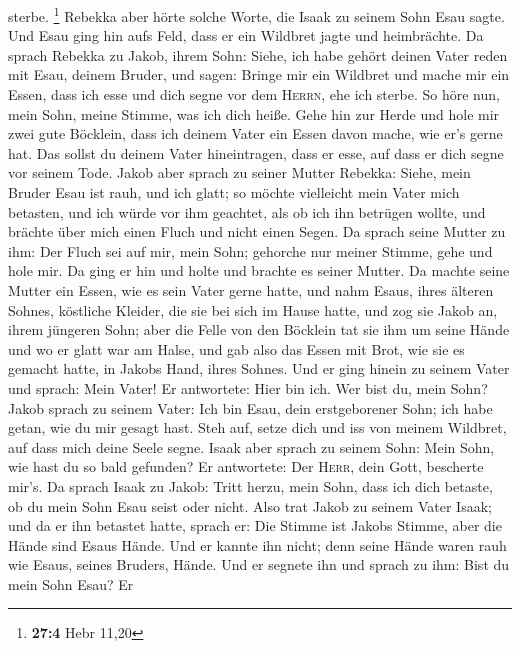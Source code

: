 sterbe. \footnote{\textbf{27:4} Hebr 11,20}  Rebekka aber
hörte solche Worte, die Isaak zu seinem Sohn Esau sagte. Und Esau ging
hin aufs Feld, dass er ein Wildbret jagte und heimbrächte.
 Da sprach Rebekka zu Jakob, ihrem Sohn: Siehe, ich habe
gehört deinen Vater reden mit Esau, deinem Bruder, und sagen:
 Bringe mir ein Wildbret und mache mir ein Essen, dass ich
esse und dich segne vor dem \textsc{Herrn}, ehe ich sterbe.
 So höre nun, mein Sohn, meine Stimme, was ich dich heiße.
 Gehe hin zur Herde und hole mir zwei gute Böcklein, dass
ich deinem Vater ein Essen davon mache, wie er's gerne hat.
 Das sollst du deinem Vater hineintragen, dass er esse,
auf dass er dich segne vor seinem Tode.  Jakob aber
sprach zu seiner Mutter Rebekka: Siehe, mein Bruder Esau ist rauh, und
ich glatt;  so möchte vielleicht mein Vater mich
betasten, und ich würde vor ihm geachtet, als ob ich ihn betrügen
wollte, und brächte über mich einen Fluch und nicht einen Segen.
 Da sprach seine Mutter zu ihm: Der Fluch sei auf mir,
mein Sohn; gehorche nur meiner Stimme, gehe und hole mir.
 Da ging er hin und holte und brachte es seiner Mutter.
Da machte seine Mutter ein Essen, wie es sein Vater gerne hatte,
 und nahm Esaus, ihres älteren Sohnes, köstliche Kleider,
die sie bei sich im Hause hatte, und zog sie Jakob an, ihrem jüngeren
Sohn;  aber die Felle von den Böcklein tat sie ihm um
seine Hände und wo er glatt war am Halse,  und gab also
das Essen mit Brot, wie sie es gemacht hatte, in Jakobs Hand, ihres
Sohnes.  Und er ging hinein zu seinem Vater und sprach:
Mein Vater! Er antwortete: Hier bin ich. Wer bist du, mein Sohn?
 Jakob sprach zu seinem Vater: Ich bin Esau, dein
erstgeborener Sohn; ich habe getan, wie du mir gesagt hast. Steh auf,
setze dich und iss von meinem Wildbret, auf dass mich deine Seele segne.
 Isaak aber sprach zu seinem Sohn: Mein Sohn, wie hast du
so bald gefunden? Er antwortete: Der \textsc{Herr}, dein Gott, bescherte
mir's.  Da sprach Isaak zu Jakob: Tritt herzu, mein Sohn,
dass ich dich betaste, ob du mein Sohn Esau seist oder nicht.
 Also trat Jakob zu seinem Vater Isaak; und da er ihn
betastet hatte, sprach er: Die Stimme ist Jakobs Stimme, aber die Hände
sind Esaus Hände.  Und er kannte ihn nicht; denn seine
Hände waren rauh wie Esaus, seines Bruders, Hände. Und er segnete ihn
 und sprach zu ihm: Bist du mein Sohn Esau? Er
